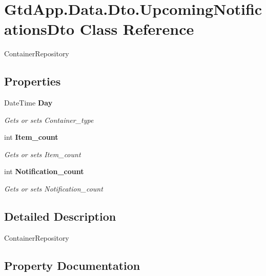 \section{Gtd\+App.\+Data.\+Dto.\+Upcoming\+Notifications\+Dto Class Reference}
\label{class_gtd_app_1_1_data_1_1_dto_1_1_upcoming_notifications_dto}


Container\+Repository  


\subsection*{Properties}
\begin{DoxyCompactItemize}
\item 
Date\+Time \textbf{ Day}\hspace{0.3cm}{\ttfamily  [get, set]}
\begin{DoxyCompactList}\small\item\em Gets or sets Container\+\_\+type \end{DoxyCompactList}\item 
int \textbf{ Item\+\_\+count}\hspace{0.3cm}{\ttfamily  [get, set]}
\begin{DoxyCompactList}\small\item\em Gets or sets Item\+\_\+count \end{DoxyCompactList}\item 
int \textbf{ Notification\+\_\+count}\hspace{0.3cm}{\ttfamily  [get, set]}
\begin{DoxyCompactList}\small\item\em Gets or sets Notification\+\_\+count \end{DoxyCompactList}\end{DoxyCompactItemize}


\subsection{Detailed Description}
Container\+Repository 



\subsection{Property Documentation}
\mbox{\label{class_gtd_app_1_1_data_1_1_dto_1_1_upcoming_notifications_dto_a553e1afb110f45555604ce1da782f741}} 
